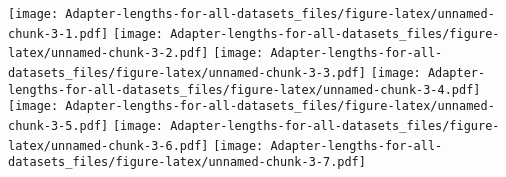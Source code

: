 \documentclass[
]{article}
\newenvironment{Shaded}{\begin{snugshade}}{\end{snugshade}}
\newcommand{\AttributeTok}[1]{\textcolor[rgb]{0.13,0.29,0.53}{#1}}
\newcommand{\ConstantTok}[1]{\textcolor[rgb]{0.56,0.35,0.01}{#1}}
\newcommand{\ControlFlowTok}[1]{\textcolor[rgb]{0.13,0.29,0.53}{\textbf{#1}}}
\newcommand{\DecValTok}[1]{\textcolor[rgb]{0.00,0.00,0.81}{#1}}
\newcommand{\FloatTok}[1]{\textcolor[rgb]{0.00,0.00,0.81}{#1}}
\newcommand{\FunctionTok}[1]{\textcolor[rgb]{0.13,0.29,0.53}{\textbf{#1}}}
\newcommand{\NormalTok}[1]{#1}
\newcommand{\OtherTok}[1]{\textcolor[rgb]{0.56,0.35,0.01}{#1}}
\newcommand{\SpecialCharTok}[1]{\textcolor[rgb]{0.81,0.36,0.00}{\textbf{#1}}}
\newcommand{\StringTok}[1]{\textcolor[rgb]{0.31,0.60,0.02}{#1}}
\begin{document}
\begin{Shaded}
\end{Shaded}

\texttt{[image: Adapter-lengths-for-all-datasets\_files/figure-latex/unnamed-chunk-3-1.pdf]}
\texttt{[image: Adapter-lengths-for-all-datasets\_files/figure-latex/unnamed-chunk-3-2.pdf]}
\texttt{[image: Adapter-lengths-for-all-datasets\_files/figure-latex/unnamed-chunk-3-3.pdf]}
\texttt{[image: Adapter-lengths-for-all-datasets\_files/figure-latex/unnamed-chunk-3-4.pdf]}
\texttt{[image: Adapter-lengths-for-all-datasets\_files/figure-latex/unnamed-chunk-3-5.pdf]}
\texttt{[image: Adapter-lengths-for-all-datasets\_files/figure-latex/unnamed-chunk-3-6.pdf]}
\texttt{[image: Adapter-lengths-for-all-datasets\_files/figure-latex/unnamed-chunk-3-7.pdf]}
\end{document}
